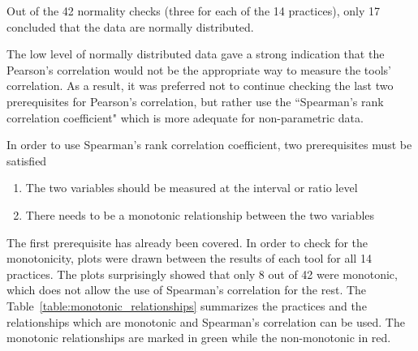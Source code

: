 Out of the 42 normality checks (three for each of the 14 practices), only 17 concluded that the data are normally distributed. 

The low level of normally distributed data gave a strong indication that the Pearson’s correlation would not be the appropriate way to measure the tools' correlation. As a result, it was preferred not to continue checking the last two prerequisites for Pearson’s correlation, but rather use the ``Spearman’s rank correlation coefficient" which is more adequate for non-parametric data.

In order to use Spearman’s rank correlation coefficient, two prerequisites must be satisfied
\begin{enumerate}
\item The two variables should be measured at the interval or ratio level
\item There needs to be a monotonic relationship between the two variables
\end{enumerate}

The first prerequisite has already been covered. In order to check for the monotonicity, plots were drawn between the results of each tool for all 14 practices. The plots surprisingly showed that only 8 out of 42 were monotonic, which does not allow the use of Spearman’s correlation for the rest. The Table~\ref{table:monotonic_relationships} summarizes the practices and the relationships which are monotonic and Spearman's correlation can be used. The monotonic relationships are marked in green while the non-monotonic in red.



